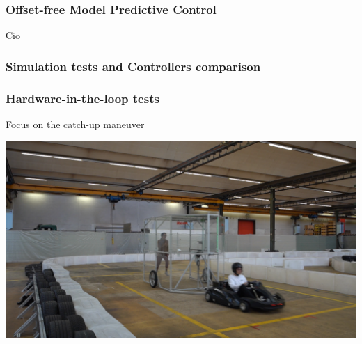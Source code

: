 \documentclass[9pt, aspectratio=169]{beamer}
\begin{document}
\begin{frame}
\frametitle{Offset-free Model Predictive Control}
Cio
\end{frame}

\begin{frame}
\frametitle{Simulation tests and Controllers comparison}
\end{frame}

\begin{frame}
\frametitle{Hardware-in-the-loop tests}
\centering
Focus on the catch-up maneuver
\begin{center}
\href{video.mp4}{
\includegraphics[scale=0.25]
{Poster}}
\end{center}
\end{frame}
\end{document}
